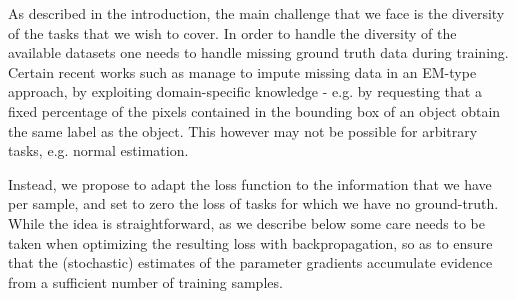 \documentclass[10pt,twocolumn,letterpaper]{article}
\begin{document}
 



As described in the introduction, the main challenge that we face is the diversity of the tasks that we wish to cover. 
%
%
In order to handle the diversity of the available datasets one needs to handle  missing ground truth data during training. Certain recent works such as \cite{papa15,OquabBLS15,dai2015boxsup} manage to impute missing data in an EM-type approach, by exploiting domain-specific knowledge - e.g. by requesting that a fixed percentage of the pixels contained in the  bounding box of an object obtain the same label as the object. This however may not be possible for arbitrary tasks, e.g. normal estimation. 

Instead, we propose to adapt the loss function to the information that we have per sample, and set to zero the loss of tasks for which we have no ground-truth. While the idea is straightforward, as we describe below some care needs to be taken when optimizing the resulting loss with backpropagation, so as to ensure that the (stochastic) estimates of the parameter gradients accumulate evidence from a sufficient number of training samples.  
\end{document}
